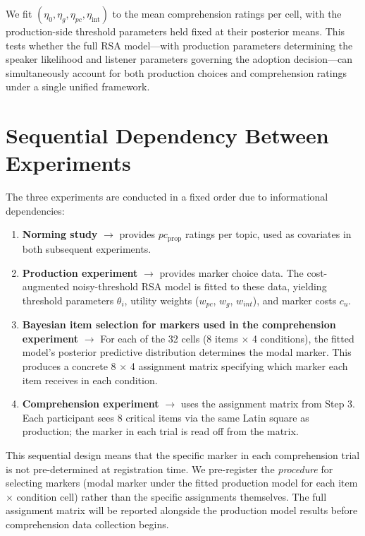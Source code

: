 \documentclass[12pt]{article}
\begin{document}
We fit $(\eta_0, \eta_g, \eta_{pc}, \eta_{\text{int}})$ to the mean comprehension ratings per cell, with the production-side threshold parameters held fixed at their posterior means. This tests whether the full RSA model---with production parameters determining the speaker likelihood and listener parameters governing the adoption decision---can simultaneously account for both production choices and comprehension ratings under a single unified framework.


\section{Sequential Dependency Between Experiments}

The three experiments are conducted in a fixed order due to informational dependencies:

\begin{enumerate}
    \item \textbf{Norming study} $\to$ provides $pc_{\text{prop}}$ ratings per topic, used as covariates in both subsequent experiments.
    \item \textbf{Production experiment} $\to$ provides marker choice data. The cost-augmented noisy-threshold RSA model is fitted to these data, yielding threshold parameters $\theta_i$, utility weights ($w_{pc}$, $w_g$, $w_{int}$), and marker costs $c_u$.
    \item \textbf{Bayesian item selection for markers used in the comprehension experiment} $\to$ For each of the 32 cells (8 items $\times$ 4 conditions), the fitted model's posterior predictive distribution determines the modal marker. This produces a concrete 8 $\times$ 4 assignment matrix specifying which marker each item receives in each condition.
    \item \textbf{Comprehension experiment} $\to$ uses the assignment matrix from Step 3. Each participant sees 8 critical items via the same Latin square as production; the marker in each trial is read off from the matrix.
\end{enumerate}

This sequential design means that the specific marker in each comprehension trial is not pre-determined at registration time. We pre-register the \emph{procedure} for selecting markers (modal marker under the fitted production model for each item $\times$ condition cell) rather than the specific assignments themselves. The full assignment matrix will be reported alongside the production model results before comprehension data collection begins.
\end{document}
